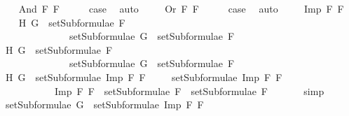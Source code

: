 \begin{isabellebody}
\isanewline
{}\isamarkupfalse%
\isanewline
\ \ \isamarkupfalse%
\ {\isacharparenleft}And\ F{}\ F{}{\isacharparenright}\isanewline
\ \ \isamarkupfalse%
\ \isamarkupfalse%
\ {\isacharquery}case\ \isamarkupfalse%
\ auto\ %
\isanewline
{}\isamarkupfalse%
\isanewline
\ \ \isamarkupfalse%
\ {\isacharparenleft}Or\ F{}\ F{}{\isacharparenright}\isanewline
\ \ \isamarkupfalse%
\ \isamarkupfalse%
\ {\isacharquery}case\ \isamarkupfalse%
\ auto\ %
\isanewline
{}\isamarkupfalse%
\isanewline
\ \ \isamarkupfalse%
\ {\isacharparenleft}Imp\ F{}\ F{}{\isacharparenright}\isanewline
\ \ \isamarkupfalse%
\ H{}{\isacharcolon}\ {\isachardoublequoteopen}G\ {\isasymin}\ setSubformulae\ F{}\ {\isasymLongrightarrow}\ \isanewline
\ \ \ \ \ \ \ \ \ \ \ \ \ \ setSubformulae\ G\ {\isasymsubseteq}\ setSubformulae\ F{}{\isachardoublequoteclose}\isanewline
\ \ \isamarkupfalse%
\ H{}{\isacharcolon}\ {\isachardoublequoteopen}G\ {\isasymin}\ setSubformulae\ F{}\ {\isasymLongrightarrow}\ \isanewline
\ \ \ \ \ \ \ \ \ \ \ \ \ \ setSubformulae\ G\ {\isasymsubseteq}\ setSubformulae\ F{}{\isachardoublequoteclose}\isanewline
\ \ \isamarkupfalse%
\ H{}{\isacharcolon}\ {\isachardoublequoteopen}G\ {\isasymin}\ setSubformulae\ {\isacharparenleft}Imp\ F{}\ F{}{\isacharparenright}{\isachardoublequoteclose}\isanewline
\ \ \isamarkupfalse%
\ {}{\isacharcolon}\ {\isachardoublequoteopen}setSubformulae\ {\isacharparenleft}Imp\ F{}\ F{}{\isacharparenright}\ {\isacharequal}\ \isanewline
\ \ \ \ \ \ \ \ \ \ \ {\isacharbraceleft}Imp\ F{}\ F{}{\isacharbraceright}\ {\isasymunion}\ {\isacharparenleft}setSubformulae\ F{}\ {\isasymunion}\ setSubformulae\ F{}{\isacharparenright}{\isachardoublequoteclose}\ \isanewline
\ \ \ \ \isamarkupfalse%
\ simp\ %
\isanewline
\ \ \isamarkupfalse%
\ \isamarkupfalse%
\ {\isachardoublequoteopen}setSubformulae\ G\ {\isasymsubseteq}\ setSubformulae\ {\isacharparenleft}Imp\ F{}\ F{}{\isacharparenright}{\isachardoublequoteclose}\isanewline

\end{isabellebody}
